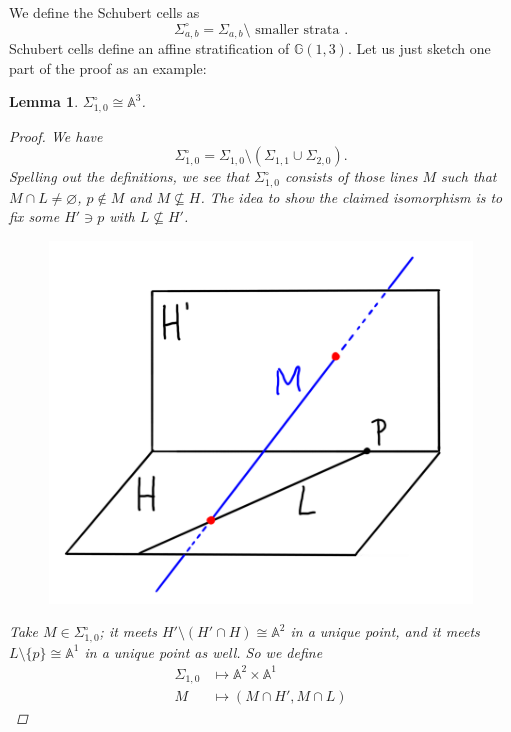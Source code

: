 \documentclass[12pt,a4paper]{amsart}
\theoremstyle{plain}
\newtheorem{lm}[thm]{Lemma}
\theoremstyle{definition}
\theoremstyle{remark}
\begin{document}
We define the Schubert cells as
\[ \Sigma_{a,b}^{\circ}=\Sigma_{a,b} \setminus \text{ smaller strata }. \]
Schubert cells define an affine stratification of $\mathbb{G}(1,3)$.
Let us just sketch one part of the proof as an example:

\begin{lm}
    $\Sigma_{1,0}^{\circ}\cong \mathbb{A}^{3}$.
    \begin{proof}
	We have
	\[ \Sigma_{1,0}^{\circ}=\Sigma_{1,0}\setminus (\Sigma_{1,1}\cup \Sigma_{2,0}). \]
	Spelling out the definitions, we see that $\Sigma_{1,0}^{\circ}$ consists of those lines $M$ such that $M\cap L\neq \varnothing$, $p\not\in M$ and $M\not\subseteq H$.
	The idea to show the claimed isomorphism is to fix some $H'\ni p$ with $L\not\subseteq H'$.
	
	\begin{figure}[H]
	    \centering
	    \includegraphics[scale=.75]{pictures/celliso}
	\end{figure}

	Take $M\in \Sigma_{1,0}^{\circ}$; it meets $H'\setminus (H'\cap H)\cong \mathbb{A}^{2}$ in a unique point, and it meets $L\setminus \{ p\}\cong \mathbb{A}^{1}$ in a unique point as well.
	So we define
	\begin{align*}
	    \Sigma_{1,0} & \longmapsto \mathbb{A}^{2}\times\mathbb{A}^{1} \\
	    M & \longmapsto (M\cap H',M\cap L)
	\end{align*}
    \end{proof}
\end{lm}
\end{document}
